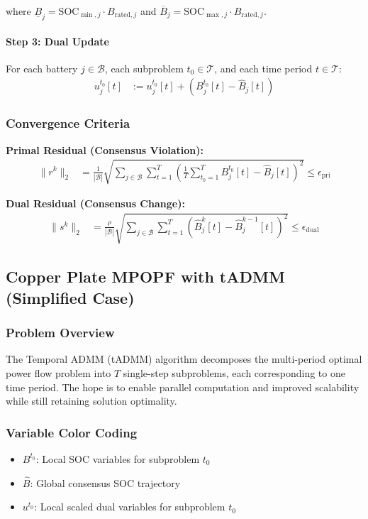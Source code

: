 where $\underline{B}_j = \text{SOC}_{\min,j} \cdot B_{\text{rated},j}$ and $\overline{B}_j = \text{SOC}_{\max,j} \cdot B_{\text{rated},j}$.

\paragraph{Step 3: Dual Update}
For each battery $j \in \mathcal{B}$, each subproblem $t_0 \in \mathcal{T}$, and each time period $t \in \mathcal{T}$:
\begin{align}
u_j^{t_0}[t] &:= u_j^{t_0}[t] + \left( B_j^{t_0}[t] - \hat{B}_j[t] \right)
\end{align}

\subsubsection{Convergence Criteria}

\textbf{Primal Residual (Consensus Violation):}
\begin{align}
\|r^k\|_2 &= \frac{1}{|\mathcal{B}|} \sqrt{\sum_{j \in \mathcal{B}} \sum_{t=1}^T \left( \frac{1}{T} \sum_{t_0=1}^T B_j^{t_0}[t] - \hat{B}_j[t] \right)^2} \leq \epsilon_{\text{pri}}
\end{align}

\textbf{Dual Residual (Consensus Change):}
\begin{align}
\|s^k\|_2 &= \frac{\rho}{|\mathcal{B}|} \sqrt{\sum_{j \in \mathcal{B}} \sum_{t=1}^T \left( \hat{B}_j^k[t] - \hat{B}_j^{k-1}[t] \right)^2} \leq \epsilon_{\text{dual}}
\end{align}

\subsection{Copper Plate MPOPF with tADMM (Simplified Case)}

\subsubsection{Problem Overview}

The Temporal ADMM (tADMM) algorithm decomposes the multi-period optimal power flow problem into $T$ single-step subproblems, each corresponding to one time period. The hope is to enable parallel computation and improved scalability while still retaining solution optimality.

\subsubsection{Variable Color Coding}
\begin{itemize}
    \item $B^{t_0}$: Local SOC variables for subproblem $t_0$
    \item $\hat{B}$: Global consensus SOC trajectory
    \item $u^{t_0}$: Local scaled dual variables for subproblem $t_0$
\end{itemize}

